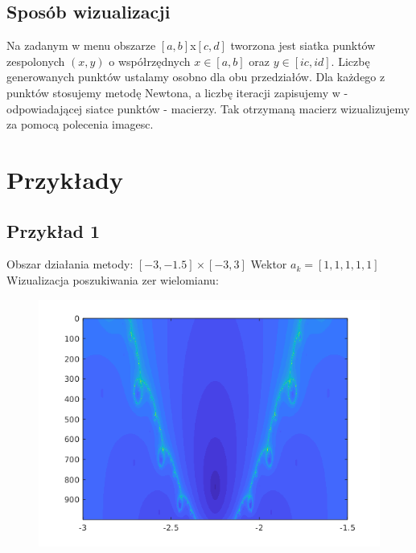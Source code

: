 \documentclass[10pt]{article}   %
\begin{document}
\subsection{Sposób wizualizacji}
Na zadanym w menu obszarze $[a, b]$x$[c, d]$ tworzona jest siatka punktów zespolonych $(x, y)$ o współrzędnych $x \in [a, b]$ oraz $y \in [ic, id]$. Liczbę generowanych punktów ustalamy osobno dla obu przedziałów. Dla każdego z punktów stosujemy metodę Newtona, a liczbę iteracji zapisujemy w - odpowiadającej siatce punktów - macierzy. Tak otrzymaną macierz wizualizujemy za pomocą polecenia imagesc.

\newpage
\section{Przykłady}

\subsection{Przykład 1}
Obszar działania metody: $ [-3,-1.5]\times[-3,3]$\newline
Wektor $a_k=[1,1,1,1,1]$\newline
Wizualizacja poszukiwania zer wielomianu:\newline

\begin{figure}[ht]
\begin{center}
\advance\leftskip-3cm
\advance\rightskip-3cm
\includegraphics[keepaspectratio=true,scale=0.8]{map2.png}
\end{center}\end{figure}
\newpage
\end{document}

